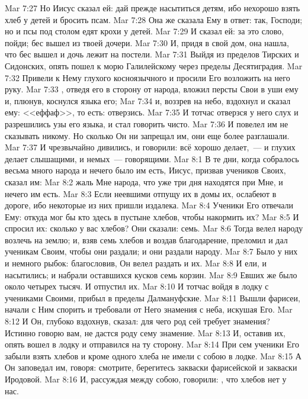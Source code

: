 \vs Mar 7:27 Но Иисус сказал ей: дай прежде насытиться детям, ибо нехорошо взять хлеб у детей и бросить псам.
\vs Mar 7:28 Она же сказала Ему в ответ: так, Господи; но и псы под столом едят крохи у детей.
\vs Mar 7:29 И сказал ей: за это слово, пойди; бес вышел из твоей дочери.
\vs Mar 7:30 И, придя в свой дом, она нашла, что бес вышел и дочь лежит на постели.
\rsbpar\vs Mar 7:31 Выйдя из пределов Тирских и Сидонских,  опять пошел к морю Галилейскому через пределы Десятиградия.
\vs Mar 7:32 Привели к Нему глухого косноязычного и просили Его возложить на него руку.
\vs Mar 7:33 , отведя его в сторону от народа, вложил персты Свои в уши ему и, плюнув, коснулся языка его;
\vs Mar 7:34 и, воззрев на небо, вздохнул и сказал ему: <<еффаф>>, то есть: отверзись.
\vs Mar 7:35 И тотчас отверзся у него слух и разрешились узы его языка, и стал говорить чисто.
\vs Mar 7:36 И повелел им не сказывать никому. Но сколько Он ни запрещал им, они еще более разглашали.
\vs Mar 7:37 И чрезвычайно дивились, и говорили: всё хорошо делает,~--- и глухих делает слышащими, и немых~--- говорящими.
\vs Mar 8:1 В те дни, когда собралось весьма много народа и нечего было им есть, Иисус, призвав учеников Своих, сказал им:
\vs Mar 8:2 жаль Мне народа, что уже три дня находятся при Мне, и нечего им есть.
\vs Mar 8:3 Если неевшими отпущу их в домы их, ослабеют в дороге, ибо некоторые из них пришли издалека.
\vs Mar 8:4 Ученики Его отвечали Ему: откуда мог бы кто  здесь в пустыне хлебов, чтобы накормить их?
\vs Mar 8:5 И спросил их: сколько у вас хлебов? Они сказали: семь.
\vs Mar 8:6 Тогда велел народу возлечь на землю; и, взяв семь хлебов и воздав благодарение, преломил и дал ученикам Своим, чтобы они раздали; и они раздали народу.
\vs Mar 8:7 Было у них и немного рыбок: благословив, Он велел раздать и их.
\vs Mar 8:8 И ели, и насытились; и набрали оставшихся кусков семь корзин.
\vs Mar 8:9 Евших же было около четырех тысяч. И отпустил их.
\rsbpar\vs Mar 8:10 И тотчас войдя в лодку с учениками Своими, прибыл в пределы Далмануфские.
\vs Mar 8:11 Вышли фарисеи, начали с Ним спорить и требовали от Него знамения с неба, искушая Его.
\vs Mar 8:12 И Он, глубоко вздохнув, сказал: для чего род сей требует знамения? Истинно говорю вам, не дастся роду сему знамение.
\vs Mar 8:13 И, оставив их, опять вошел в лодку и отправился на ту сторону.
\vs Mar 8:14 При сем ученики Его забыли взять хлебов и кроме одного хлеба не имели с собою в лодке.
\vs Mar 8:15 А Он заповедал им, говоря: смотрите, берегитесь закваски фарисейской и закваски Иродовой.
\vs Mar 8:16 И, рассуждая между собою, говорили: , что хлебов нет у нас.
